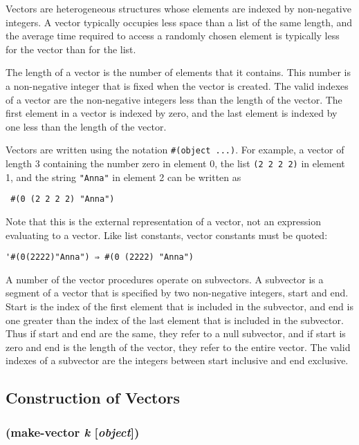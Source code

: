 \documentclass{article}
\begin{document}
Vectors are heterogeneous structures whose elements are indexed by non-negative integers. A
vector typically occupies less space than a list of the same length, and the average time
required to access a randomly chosen element is typically less for the vector than for the
list.

The length of a vector is the number of elements that it contains. This number is a
non-negative integer that is fixed when the vector is created. The valid indexes of a vector
are the non-negative integers less than the length of the vector. The first element in a
vector is indexed by zero, and the last element is indexed by one less than the length of the
vector.

Vectors are written using the notation \verb|#(object ...)|. For example, a vector of
length 3 containing the number zero in element 0, the list \verb|(2 2 2 2)| in element 1,
and the string \verb|"Anna"| in element 2 can be written as

\begin{verbatim}
 #(0 (2 2 2 2) "Anna")
\end{verbatim}

Note that this is the external representation of a vector, not an expression evaluating to a
vector. Like list constants, vector constants must be quoted:

\begin{verbatim}
'#(0(2222)"Anna") ⇒ #(0 (2222) "Anna")
\end{verbatim}

A number of the vector procedures operate on subvectors. A subvector is a segment of a vector
that is specified by two non-negative integers, start and end. Start is the index of the first
element that is included in the subvector, and end is one greater than the index of the last
element that is included in the subvector. Thus if start and end are the same, they refer to a
null subvector, and if start is zero and end is the length of the vector, they refer to the
entire vector. The valid indexes of a subvector are the integers between start inclusive and
end exclusive.

\subsection{Construction of Vectors}\label{sec:construction-of-vectors}

\subsubsection{(make-vector \emph{k} [\emph{object}])}
\end{document}
